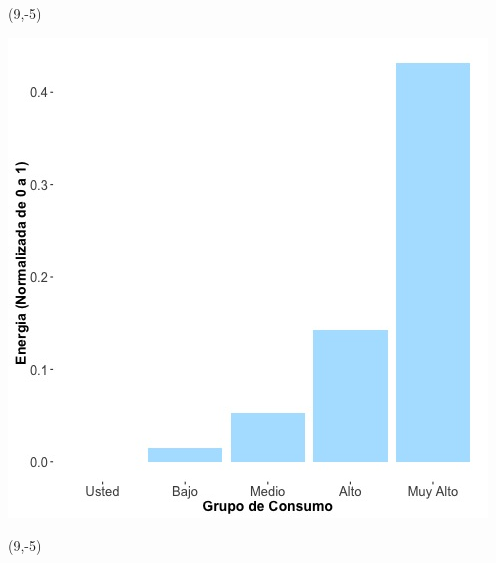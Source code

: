 \documentclass{article}\usepackage[]{graphicx}\usepackage[]{color}
\newenvironment{knitrout}{}{} %
\begin{document}
 \begin{textblock}{1}(9,-5)
\begin{minipage}{20em}
\begingroup

\endgroup
\end{minipage}
\end{textblock}


\begin{knitrout}
\color{fgcolor}
\includegraphics[scale=0.65]{figure/A18_neighbor_plot} 
\end{knitrout}

 \begin{textblock}{1}(9,-5)
\begin{minipage}{20em}
\begingroup

\endgroup
\end{minipage}
\end{textblock}
\end{document}
